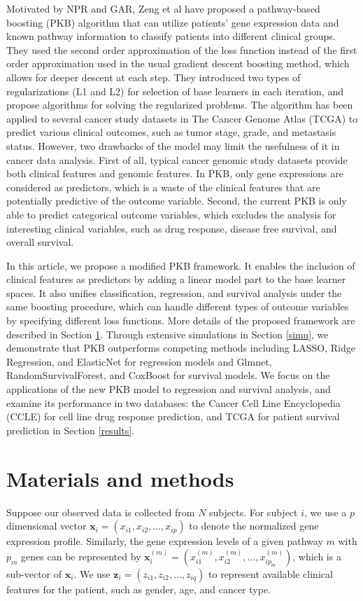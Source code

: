 \documentclass[a4paper,12pt]{article}
\newcommand{\bd}[1]{\mathbf{#1}}
\newcommand{\pathexpr}[3]{{#1}_{#2}^{(#3)}}
\begin{document}
	Motivated by NPR and GAR, Zeng et al\cite{zeng2019pathway} have proposed a pathway-based boosting (PKB) algorithm that can utilize patients' gene expression data and known pathway information to classify patients into different clinical groups. They used the second order approximation of the loss function instead of the first order approximation used in the usual gradient descent boosting method, which allows for deeper descent at each step. They introduced two types of regularizations (L1 and L2) for selection of base learners in each iteration, and propose algorithms for solving the regularized problems. The algorithm has been applied to several cancer study datasets in The Cancer Genome Atlas (TCGA) to predict various clinical outcomes, such as tumor stage, grade, and metastasis status. However, two drawbacks of the model may limit the usefulness of it in cancer data analysis. First of all, typical cancer genomic study datasets provide both clinical features and genomic features. In PKB, only gene expressions are considered as predictors, which is a waste of the clinical features that are potentially predictive of the outcome variable. Second, the current PKB is only able to predict categorical outcome variables, which excludes the analysis for interesting clinical variables, such as drug response, disease free survival, and overall survival. 
	
	In this article, we propose a modified PKB framework. It enables the inclusion of clinical features as predictors by adding a linear model part to the base learner spaces. It also unifies classification, regression, and survival analysis under the same boosting procedure, which can handle different types of outcome variables by specifying different loss functions. More details of the proposed framework are described in Section \ref{methods}. Through extensive simulations in Section \ref{simu}, we demonstrate that PKB outperforms competing methods including LASSO,\cite{tibshirani1996regression} Ridge Regression,\cite{hoerl1970ridge} and ElasticNet\cite{zou2005regularization} for regression models and Glmnet,\cite{simon2011regularization} RandomSurvivalForest,\cite{ishwaran2008random} and CoxBoost\cite{binder2013coxboost} for survival models. We focus on the applications of the new PKB model to regression and survival analysis, and examine its performance in two databases:  the Cancer Cell Line Encyclopedia (CCLE) for cell line drug response prediction, and TCGA for patient survival prediction in Section \ref{results}.
	\section{Materials and methods}\label{methods}
	Suppose our observed data is collected from $N$ subjects. For subject $i$, we use a $p$ dimensional vector $\bd{x}_i = (x_{i1}, x_{i2}, \ldots, x_{ip})$ to denote the normalized gene expression profile. Similarly, the gene expression levels of a given pathway $m$ with $p_m$ genes can be represented by $\pathexpr{\bd{x}}{i}{m} = (\pathexpr{x}{i1}{m},\pathexpr{x}{i2}{m}, \ldots, \pathexpr{x}{ip_m}{m})$, which is a sub-vector of $\bd{x}_i$. We use $\bd{z}_i = (z_{i1}, z_{i2}, \ldots, z_{iq})$ to represent available clinical features for the patient, such as gender, age, and cancer type.
	
\end{document}
